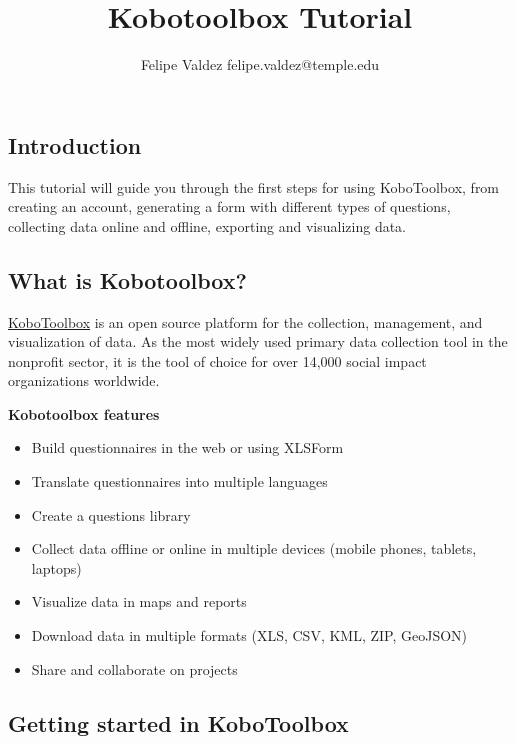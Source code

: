 \documentclass[
  letterpaper,
  DIV=11,
  numbers=noendperiod]{scrartcl}
\title{Kobotoolbox Tutorial}
\author{Felipe Valdez felipe.valdez@temple.edu}
\date{}
\providecommand{\tightlist}{%
  \setlength{\itemsep}{0pt}\setlength{\parskip}{0pt}}\usepackage{longtable,booktabs,array}
\renewcommand*\contentsname{Table of contents}
\newcommand\contentsname{Table of contents}
\begin{document}
\maketitle

\renewcommand*\contentsname{Table of contents}
{
\hypersetup{linkcolor=}
\setcounter{tocdepth}{3}
\tableofcontents
}

\subsection{Introduction}\label{introduction}

This tutorial will guide you through the first steps for using
KoboToolbox, from creating an account, generating a form with different
types of questions, collecting data online and offline, exporting and
visualizing data.

\subsection{What is Kobotoolbox?}\label{what-is-kobotoolbox}

\href{https://www.kobotoolbox.org/about-us/software/}{KoboToolbox} is an
open source platform for the collection, management, and visualization
of data. As the most widely used primary data collection tool in the
nonprofit sector, it is the tool of choice for over 14,000 social impact
organizations worldwide.


\textbf{Kobotoolbox features}

\begin{itemize}
\tightlist
\item
  Build questionnaires in the web or using XLSForm
\item
  Translate questionnaires into multiple languages
\item
  Create a questions library
\item
  Collect data offline or online in multiple devices (mobile phones,
  tablets, laptops)
\item
  Visualize data in maps and reports
\item
  Download data in multiple formats (XLS, CSV, KML, ZIP, GeoJSON)
\item
  Share and collaborate on projects
\end{itemize}

\subsection{Getting started in
KoboToolbox}\label{getting-started-in-kobotoolbox}
\end{document}
